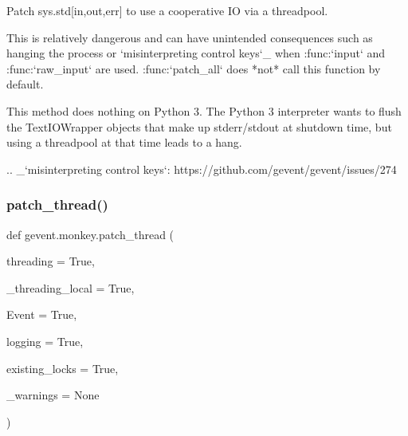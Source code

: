 \begin{DoxyVerb}Patch sys.std[in,out,err] to use a cooperative IO via a
threadpool.

This is relatively dangerous and can have unintended consequences
such as hanging the process or `misinterpreting control keys`_
when :func:`input` and :func:`raw_input` are used. :func:`patch_all`
does *not* call this function by default.

This method does nothing on Python 3. The Python 3 interpreter
wants to flush the TextIOWrapper objects that make up
stderr/stdout at shutdown time, but using a threadpool at that
time leads to a hang.

.. _`misinterpreting control keys`: https://github.com/gevent/gevent/issues/274
\end{DoxyVerb}
 \mbox{\label{namespacegevent_1_1monkey_a922c34edbe660ed3786aeabcced05e13}} 
\subsubsection{\texorpdfstring{patch\+\_\+thread()}{patch\_thread()}}
{\footnotesize\ttfamily def gevent.\+monkey.\+patch\+\_\+thread (\begin{DoxyParamCaption}\item[{}]{threading = {\ttfamily True},  }\item[{}]{\+\_\+threading\+\_\+local = {\ttfamily True},  }\item[{}]{Event = {\ttfamily True},  }\item[{}]{logging = {\ttfamily True},  }\item[{}]{existing\+\_\+locks = {\ttfamily True},  }\item[{}]{\+\_\+warnings = {\ttfamily None} }\end{DoxyParamCaption})}


